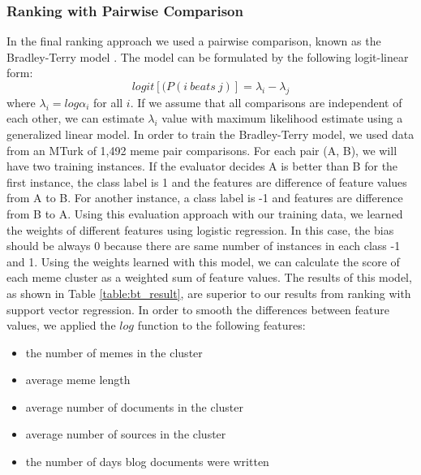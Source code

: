 \documentclass{sig-alternate}
\begin{document}
\subsubsection{Ranking with Pairwise Comparison}
In the final ranking approach we used a pairwise comparison, known as the Bradley-Terry model \cite{Bradley1952}. The model can be formulated by the following logit-linear form:
\begin{displaymath}
 logit[(P(i\ beats\ j)]=\lambda_i - \lambda_j
\end{displaymath}
where $\lambda_i=log\alpha_i$ for all $i$. If we assume that all comparisons are independent of each other, we can estimate $\lambda_i$ value with maximum likelihood estimate using a generalized linear model. In order to train the Bradley-Terry model, we used data from an MTurk of 1,492 meme pair comparisons. For each pair (A, B), we will have two training instances. If the evaluator decides A is better than B for the first instance, the class label is 1 and the features are difference of feature values from A to B. For another instance, a class label is -1 and features are difference from B to A. Using this evaluation approach with our training data, we learned the weights of different features using logistic regression. In this case, the bias should be always 0 because there are same number of instances in each class -1 and 1. Using the weights learned with this model, we can calculate the score of each meme cluster as a weighted sum of feature values. The results of this model, as shown in Table \ref{table:bt_result}, are superior to our results from ranking with support vector regression. In order to smooth the differences between feature values, we applied the $log$ function to the following features:
\begin{itemize}
 \item the number of memes in the cluster
 \item average meme length
 \item average number of documents in the cluster
 \item average number of sources in the cluster
 \item the number of days blog documents were written
\end{itemize}
\end{document}
